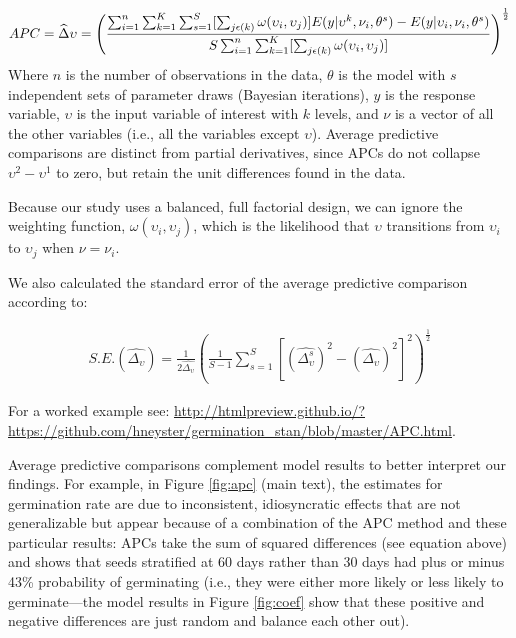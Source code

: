 \documentclass[12pt]{article}\usepackage[]{graphicx}\usepackage[]{color}
\begin{document}
\begin{align}
APC = \widehat{\Delta} \upsilon =  \left( \frac{\sum_{i=1}^{n} \sum_{k=1}^{K} \sum_{s=1}^{S} [\sum_{j\space \epsilon(k)} \omega(\upsilon_i,\upsilon_j)]E(y|\upsilon^{k}, \nu_i,\theta^s) - E(y|\upsilon_i, \nu_i,\theta^s)} {S \sum_{i=1}^{n} \sum_{k=1}^{K}[\sum_{j\space \epsilon(k)} \omega(\upsilon_i,\upsilon_j)]} \right) ^{\frac{1}{2}}
\end{align}
Where $n$ is the number of observations in the data, $\theta$ is the model with $s$ independent sets of parameter draws (Bayesian iterations), $y$ is the response variable, $\upsilon$ is the input variable of interest with $k$ levels, and $\nu$ is a vector of all the other variables (i.e., all the variables except $\upsilon$). 
Average predictive comparisons are distinct from partial derivatives, since APCs do not collapse $\upsilon^{2} - \upsilon^{1}$ to zero, but retain the unit differences found in the data. 

Because our study uses a balanced, full factorial design, we can ignore the weighting function, $\omega(\upsilon_i,\upsilon_j)$, which is the likelihood that $\upsilon$ transitions from $\upsilon_i$ to $\upsilon_j$ when $\nu = \nu_i$. 

We also calculated the standard error of the average predictive comparison according to: 

\begin{align}
S.E.(\widehat{\Delta_\upsilon})=\frac{1}{2 \widehat{\Delta_\upsilon}}\left( \frac{1}{S-1} \sum_{s=1}^S[(\widehat{\Delta_\upsilon^s})^2-(\widehat{\Delta_\upsilon})^2]^{2} \right)^{\frac{1}{2}}
\end{align}

For a worked example see: \url{http://htmlpreview.github.io/?https://github.com/hneyster/germination_stan/blob/master/APC.html}.


Average predictive comparisons complement model results to better interpret our findings. For example, in Figure \ref{fig:apc} (main text),
the estimates for germination rate are due to inconsistent,
idiosyncratic effects that are not generalizable but appear because of a
combination of the APC method and these particular results: APCs take
the sum of squared differences (see equation above) and shows that seeds stratified at 60 days rather
than 30 days had plus or minus 43\% probability of germinating (i.e.,
they were either more likely or less likely to germinate---the model
results in Figure \ref{fig:coef} show that these positive and negative differences are just random and
balance each other out).
\printbibliography
\end{document}
